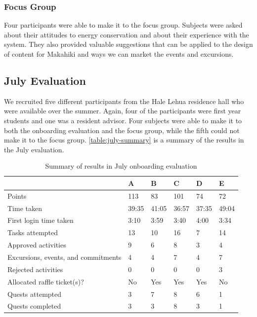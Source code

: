 \subsubsection{Focus Group}

Four participants were able to make it to the focus group. Subjects were asked about their attitudes to energy conservation and about their experience with the system. They also provided valuable suggestions that can be applied to the design of content for Makahiki and ways we can market the events and excursions.

\subsection{July Evaluation}

We recruited five different participants from the Hale Lehua residence hall who were available over the summer. Again, four of the participants were first year students and one was a resident advisor. Four subjects were able to make it to both the onboarding evaluation and the focus group, while the fifth could not make it to the focus group. \autoref{table:july-summary} is a summary of the results in the July evaluation.

\begin{table}[t]
	\begin{tabular}{| l || p{1cm} | p{1cm} | p{1cm} | p{1cm} | p{1cm} |}
		\hline
		& A & B & C & D & E \\
		\hline
		Points & 113 & 83 & 101 & 74 & 72 \\
    Time taken & 39:35 & 41:05 & 36:57 & 37:35 & 49:04 \\
    First login time taken & 3:10 & 3:59 & 3:40 & 4:00 & 3:34 \\
    Tasks attempted & 13 & 10 & 16 & 7 & 14 \\
    Approved activities & 9 & 6 & 8 & 3 & 4 \\
    Excursions, events, and commitments & 4 & 4 & 7 & 4 & 7 \\
    Rejected activities & 0 & 0 & 0 & 0 & 3 \\
    Allocated raffle ticket(s)? & No & Yes & Yes & Yes & No \\
    Quests attempted & 3 & 7 & 8 & 6 & 1 \\
    Quests completed & 3 & 3 & 8 & 3 & 1 \\
		\hline
	\end{tabular}
	\caption{Summary of results in July onboarding evaluation}
	\label{table:july-summary}
\end{table}

